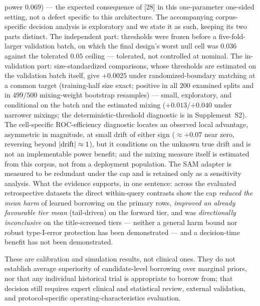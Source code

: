 \documentclass[11pt]{article}
\begin{document}
power $0.069$) --- the expected consequence of [28] in this one-parameter
one-sided setting, not a defect specific to this architecture. The
accompanying corpus-specific decision analysis is exploratory and we state
it as such, keeping its two parts distinct. The independent part:
thresholds were frozen before a five-fold-larger validation batch, on
which the final design's worst null cell was $0.036$ against the
tolerated $0.05$ ceiling --- tolerated, not controlled at nominal. The
in-validation part: size-standardized comparisons, whose thresholds
are estimated on the validation batch itself, give $+0.0025$ under
randomized-boundary matching at a common target (training-half size
exact; positive in all $200$ examined splits and in $499/500$
mixing-weight bootstrap resamples) --- small, exploratory, and
conditional on the batch and the estimated mixing ($+0.013$/$+0.040$
under narrower mixings; the deterministic-threshold diagnostic is in
Supplement~S2). The cell-specific
ROC-efficiency diagnostic locates an observed local advantage, asymmetric
in magnitude, at small
drift of either sign ($\approx +0.07$ near zero, reversing beyond
$|{\rm drift}| \approx 1$), but it conditions on the unknown true drift
and is not an implementable power benefit; and the mixing measure itself
is estimated from this corpus, not from a
deployment population. The SAM adapter is
measured to be redundant under the cap and is retained only as a
sensitivity analysis. What the evidence supports, in one sentence: across
the evaluated retrospective datasets the direct within-query contrasts
show the cap \emph{reduced the mean harm} of learned borrowing on the
primary rows, \emph{improved an already favourable tier mean}
(tail-driven) on
the forward tier, and was \emph{directionally inconclusive} on the
title-screened tiers --- neither a
general harm bound nor robust type-I-error protection has been
demonstrated --- and a decision-time benefit has not been demonstrated.

These are calibration and simulation results, not clinical ones. They do not
establish average superiority of candidate-level borrowing over marginal
priors, nor that any individual historical trial is appropriate to borrow
from; that decision still requires expert clinical and statistical review,
external validation, and protocol-specific operating-characteristics
evaluation.

\end{document}
